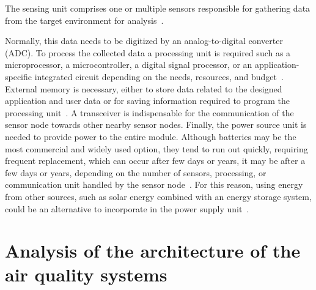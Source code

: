 \documentclass[10pt]{../imeko_acta}
\begin{document}
The sensing unit comprises one or multiple sensors responsible for gathering data from the target environment for analysis~\cite{1197877, 6949922,9538816}.

Normally, this data needs to be digitized by an analog-to-digital converter (ADC). To process the collected data a processing unit is required such as a microprocessor, a microcontroller, a digital signal processor, or an application-specific integrated circuit depending on the needs, resources, and budget~\cite{6861346, 6949922}. External memory is necessary, either to store data related to the designed application and user data or for saving information required to program the processing unit~\cite{6949922}. A transceiver is indispensable for the communication of the sensor node towards other nearby sensor nodes. Finally, the power source unit is needed to provide power to the entire module.
Although batteries may be the most commercial and widely used option, they tend to run out quickly, requiring frequent replacement, which can occur after few days or years, it may be after a few days or years, depending on the number of sensors, processing, or communication unit handled by the sensor node~\cite{5339410}. For this reason, using energy from other sources, such as solar energy combined with an energy storage system, could be an alternative to incorporate in the power supply unit~\cite{5339410}.	

\section{Analysis of the architecture of the air quality systems}
\end{document}
